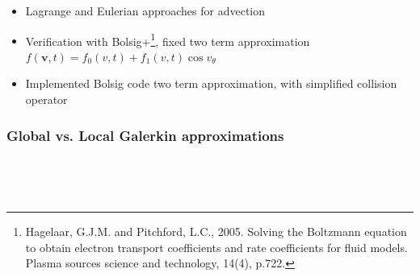 \documentclass[mathserif, aspectratio=169]{beamer}
\newcommand{\vect}[1]{\boldsymbol{#1}}
\begin{document}
\begin{frame}
\begin{itemize}
		\item Lagrange and Eulerian approaches for advection

		\item Verification with Bolsig+\footnote[frame]{Hagelaar, G.J.M. and Pitchford, L.C., 2005. Solving the Boltzmann equation to obtain electron transport coefficients and rate coefficients for fluid models. Plasma sources science and technology, 14(4), p.722.}, fixed two term approximation $f(\vect{v},t) = f_0(v, t) + f_1(v,t)\cos v_\theta$

		\item Implemented Bolsig code two term approximation, with simplified collision operator
	\end{itemize}
\end{frame}

\begin{frame}[fragile]
	\frametitle{Global vs. Local Galerkin approximations}\
	\vspace{-0.5in}
	\begin{figure}
		\\
	\end{figure}
\end{frame}
\end{document}
